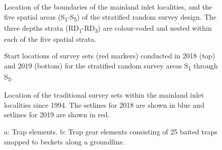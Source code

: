 \documentclass[12pt]{article}\usepackage[]{graphicx}\usepackage[]{color}
\begin{document}
\begin{figure}[htb]

{\centering {} 

}

\caption{Location of the boundaries of the mainland inlet localities, and the five spatial areas (S\textsubscript{1}-S\textsubscript{5}) of the stratified random survey design. The three depths strata (RD\textsubscript{1}-RD\textsubscript{3}) are colour-coded and nested within each of the five spatial strata.}\label{fig:figure1}
\end{figure}
\clearpage


\begin{figure}[htb]

{\centering {} 

}

\caption{Start locations of survey sets (red markers) conducted in 2018 (top) and 2019 (bottom) for the stratified random survey areas S\textsubscript{1} through S\textsubscript{5}.}\label{fig:figure2}
\end{figure}
\clearpage


\begin{figure}[htb]

{\centering {} 

}

\caption{Location of the traditional survey sets within the mainland inlet localities since 1994. The setlines for 2018 are shown in blue and setlines for 2019 are shown in red.}\label{fig:figure3}
\end{figure}
\clearpage


\begin{figure}[htb]

{\centering {} 

}

\caption{a: Trap elements. b: Trap gear elements consisting of 25 baited traps snapped to beckets along a groundline.}\label{fig:figure4}
\end{figure}
\clearpage
\end{document}
